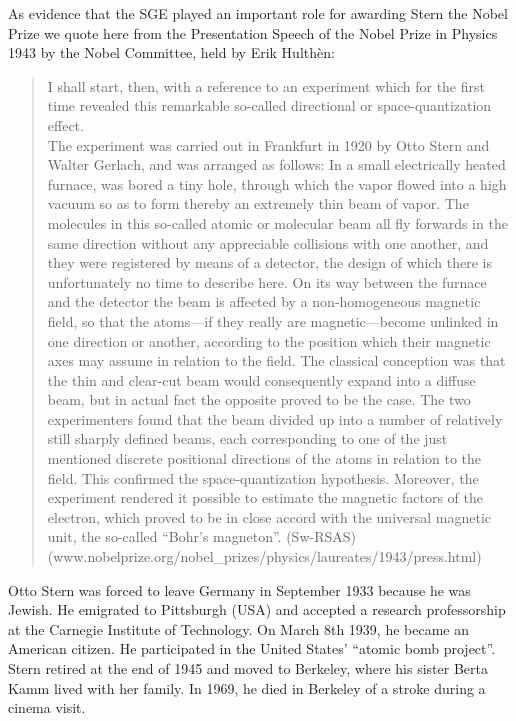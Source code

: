 \documentclass[12pt]{article}
\begin{document}
As evidence that the SGE played an important role for awarding Stern the Nobel Prize we quote here from the Presentation Speech of the Nobel Prize in Physics 1943 by the Nobel Committee, held by Erik Hulthèn: 
\begin{quote}
I shall start, then, with a reference to an experiment which for the first time revealed this remarkable so-called directional or space-quantization effect.\\
The experiment was carried out in Frankfurt in 1920 by Otto Stern and Walter Gerlach, and was arranged as follows: In a small electrically heated furnace, was bored a tiny hole, through which the vapor flowed into a high vacuum so as to form thereby an extremely thin beam of vapor. The molecules in this so-called atomic or molecular beam all fly forwards in the same direction without any appreciable collisions with one another, and they were registered by means of a detector, the design of which there is unfortunately no time to describe here. On its way between the furnace and the detector the beam is affected by a non-homogeneous magnetic field, so that the atoms---if they really are magnetic---become unlinked in one direction or another, according to the position which their magnetic axes may assume in relation to the field. The classical conception was that the thin and clear-cut beam would consequently expand into a diffuse beam, but in actual fact the opposite proved to be the case. The two experimenters found that the beam divided up into a number of relatively still sharply defined beams, each corresponding to one of the just mentioned discrete positional directions of the atoms in relation to the field. This confirmed the space-quantization hypothesis. Moreover, the experiment rendered it possible to estimate the magnetic factors of the electron, which proved to be in close accord with the universal magnetic unit, the so-called ``Bohr's magneton''. (Sw-RSAS) 
(www.nobelprize.org/nobel\_prizes/physics/laureates/1943/press.html)
\end{quote}

Otto Stern was forced to leave Germany in September 1933 because he was Jewish. He emigrated to Pittsburgh (USA) and accepted a research professorship at the Carnegie Institute of Technology. On March 8th 1939, he became an American citizen.
He participated in the United States' ``atomic bomb project''. Stern retired at the end of 1945 and moved to Berkeley, where his sister Berta Kamm lived with her family. In 1969, he died in Berkeley of a stroke during a cinema visit. 
\end{document}
